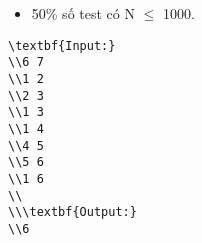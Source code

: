 \begin{itemize}
	\item     50\% số test có N  $\le$  1000.   
\end{itemize}
\begin{verbatim}
\textbf{Input:}
\\6 7
\\1 2
\\2 3
\\1 3
\\1 4
\\4 5
\\5 6
\\1 6
\\
\\\textbf{Output:}
\\6\end{verbatim}